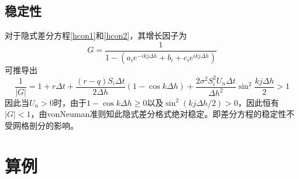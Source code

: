 \documentclass{ctexart} %
\begin{document}
\subsection{稳定性}
对于隐式差分方程\eqref{hcon1}和\eqref{hcon2}，其增长因子为
\begin{equation}
G=\frac{1}{1-(a_ie^{-ikj\Delta h}+b_i+c_ie^{ikj\Delta h})}
\end{equation}
可推导出
\begin{equation}
\frac{1}{|G|}=1+r\Delta t+\frac{(r-q)S_i\Delta t}{2\Delta h}(1-\cos k\Delta h)+\frac{2\sigma^2S_i^2U_{n}\Delta t}{\Delta h^2}\sin^2\frac{kj\Delta h}{2}>1
\end{equation}
因此当$U_n>0$时，由于$1-\cos k\Delta h\geq 0$以及$\sin^2(kj\Delta h/2)>0$，因此恒有$|G|<1$，由vonNeuman准则知此隐式差分格式绝对稳定。即差分方程的稳定性不受网格剖分的影响。

\section{算例}
\end{document}
